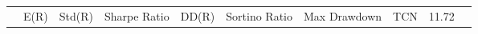 \begin{tabular}{lrrrrrrrrr}
 & E(R) & Std(R) & Sharpe Ratio & DD(R) & Sortino Ratio & Max Drawdown & %
TCN & 11.72%
\end{tabular}
